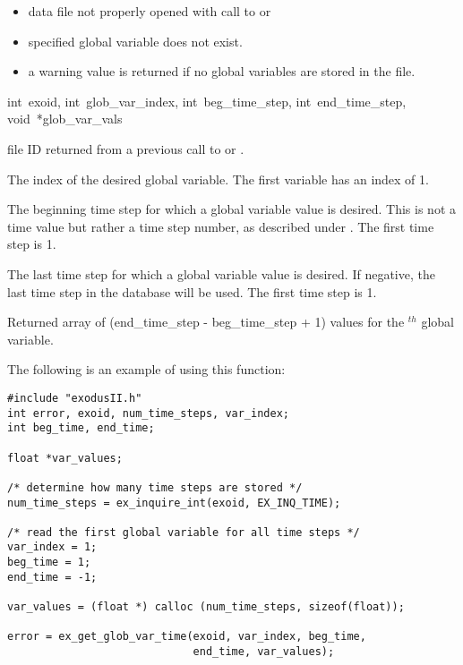 \begin{itemize}
 \item data file not properly opened with call to 
or 

 \item specified global variable does not exist.

 \item a warning value is returned if no global variables
are stored in the file.
\end{itemize}


{int~exoid,
int~glob_var_index,
int~beg_time_step,
int~end_time_step,
void~*glob_var_vals}

\begin{parameters}
\item[{int exoid \R{}}]
\exo{} file ID returned from a previous call to 
or .

\item[{int glob_var_index \R{}}]
The index of the desired global variable. The first variable
has an index of 1.

\item[{int beg_time_step \R{}}]
The beginning time step for which a global variable value is
desired. This is not a time value but rather a time step number, as
described under . The first time step is 1.

\item[{int end_time_step \R{}}]
The last time step for which a global variable value is desired. If
negative, the last time step in the database will be used. The first
time step is 1.

\item[{void* glob_var_vals \W{}}]
Returned array of (end_time_step - beg_time_step +
1) values for the $^{th}$ global variable.
\end{parameters}

The following is an example of using this function:

\begin{lstlisting}
#include "exodusII.h"
int error, exoid, num_time_steps, var_index;
int beg_time, end_time;

float *var_values;

/* determine how many time steps are stored */
num_time_steps = ex_inquire_int(exoid, EX_INQ_TIME);

/* read the first global variable for all time steps */
var_index = 1;
beg_time = 1;
end_time = -1;

var_values = (float *) calloc (num_time_steps, sizeof(float));

error = ex_get_glob_var_time(exoid, var_index, beg_time,
                             end_time, var_values);
\end{lstlisting}

